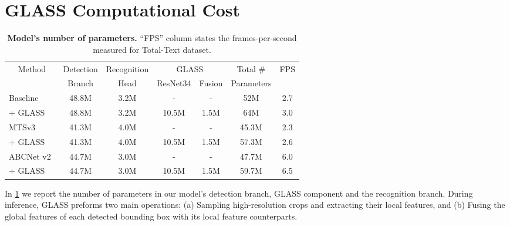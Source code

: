 \documentclass[runningheads]{llncs}
\begin{document}
\section{GLASS Computational Cost}
\label{sec:computational}
\begin{table}[t]
\centering
\caption{\textbf{Model's number of parameters.}  ``FPS'' column states the frames-per-second measured for Total-Text dataset.}
\label{tab:params}
{
\begin{tabular}{l c c cc c c}
\toprule
\multicolumn{1}{c}{\multirow{2}{*}{Method}} &  \multicolumn{1}{c}{Detection} & \multicolumn{1}{c}{\multirow{1}{*}{Recognition}} & \multicolumn{2}{c}{GLASS} & \multicolumn{1}{c}{\multirow{1}{*}{Total \#}} &  \multicolumn{1}{c}{\multirow{2}{*}{FPS}}  \\ 
 &  \multicolumn{1}{c}{Branch} & \multicolumn{1}{c}{\multirow{1}{*}{Head}} & \multicolumn{1}{c}{ResNet34} & \multicolumn{1}{c}{Fusion} & \multicolumn{1}{c}{\multirow{1}{*}{Parameters}} &  \\ 
\midrule
Baseline  & 48.8M & 3.2M &-& -& 52M & 2.7 \\ 
\quad + GLASS& 48.8M & 3.2M & 10.5M & 1.5M & 64M & 3.0 \\ 
\midrule
\midrule
MTSv3~\cite{liao2020spotterV3}  & 41.3M & 4.0M &-& -& 45.3M & 2.3\\ 
\quad + GLASS& 41.3M & 4.0M & 10.5M & 1.5M & 57.3M & 2.6\\ 
\midrule
\midrule
ABCNet v2~\cite{liu2021abcnetV2}  & 44.7M & 3.0M &-& -& 47.7M & 6.0\\ 
\quad + GLASS& 44.7M & 3.0M & 10.5M & 1.5M & 59.7M & 6.5\\ 
\bottomrule
\end{tabular}}
\end{table}

%
 
In \cref{tab:params} we report the number of parameters in our model's detection branch, GLASS component and the recognition branch.
During inference, GLASS preforms two main operations: (a) Sampling high-resolution crops and extracting their local features, and (b) Fusing the global features of each detected bounding box with its local feature counterparts.
\end{document}
